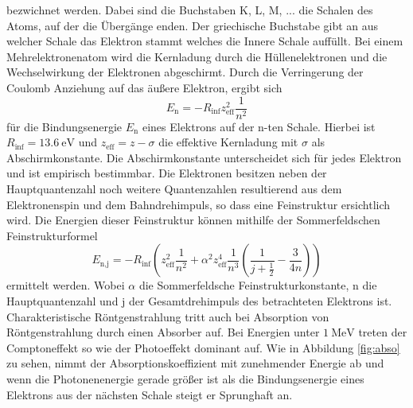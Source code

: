  bezwichnet werden. Dabei sind die Buchstaben K, L, M, ... die Schalen des Atoms, auf der die Übergänge enden. Der griechische Buchstabe gibt an aus welcher Schale das Elektron stammt welches die Innere Schale auffüllt.
 Bei einem Mehrelektronenatom wird die Kernladung durch die Hüllenelektronen und die Wechselwirkung der Elektronen abgeschirmt. Durch die Verringerung der Coulomb Anziehung auf das äußere Elektron, ergibt sich 
 \begin{equation}
     E_\text{n}=-R_{\inf} z_\text{eff}^2 \frac{1}{n^2}
     \label{eqn:Bindungse}
 \end{equation}
 für die Bindungsenergie $E_\text{n}$ eines Elektrons auf der n-ten Schale. Hierbei ist $R_{\inf}=\SI{13.6}{\electronvolt}$ und $z_\text{eff}=z - \sigma$ die effektive Kernladung mit $\sigma$ als Abschirmkonstante.
 Die Abschirmkonstante unterscheidet sich für jedes Elektron und ist  empirisch bestimmbar. Die Elektronen besitzen neben der Hauptquantenzahl noch weitere Quantenzahlen resultierend aus dem Elektronenspin und dem Bahndrehimpuls, so dass eine Feinstruktur ersichtlich wird.
 Die Energien dieser Feinstruktur können mithilfe der Sommerfeldschen Feinstrukturformel 
 \begin{equation}
     E_\text{n,j}=-R_{\inf} \left(z_\text{eff}^2 \frac{1}{n^2} + \alpha^2 z_\text{eff}^4 \frac{1}{n^3} \left(\frac{1}{j+\frac{1}{2}} - \frac{3}{4n}\right) \right)
     \label{eqn:sommerfeld}
 \end{equation}
ermittelt werden. Wobei $\alpha$ die Sommerfeldsche Feinstrukturkonstante, n die Hauptquantenzahl und j der Gesamtdrehimpuls des betrachteten Elektrons ist.
\\
Charakteristische Röntgenstrahlung tritt auch bei Absorption von Röntgenstrahlung durch einen Absorber auf. Bei Energien unter $\SI{1}{\mega \electronvolt}$
treten der Comptoneffekt so wie der Photoeffekt dominant auf. Wie in Abbildung \ref{fig:abso} zu sehen, nimmt der Absorptionskoeffizient mit zunehmender Energie ab und wenn die Photonenenergie gerade größer ist als die Bindungsenergie eines Elektrons aus der nächsten Schale steigt er Sprunghaft an.
